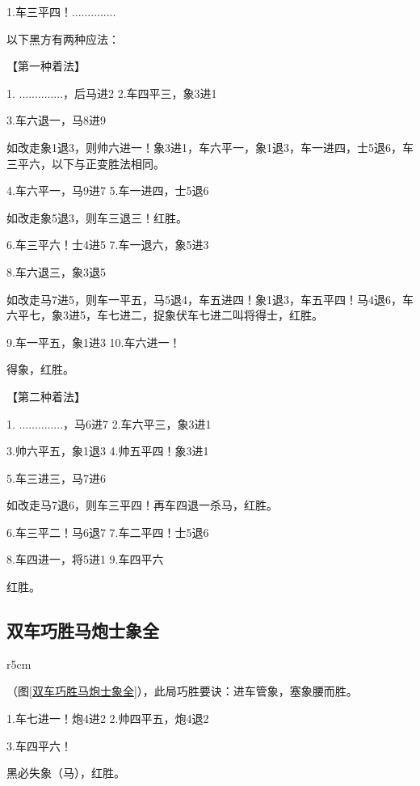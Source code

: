 \documentclass[UTF8]{ctexbook}
\newcommand{\rc}[2]{\piece{#1}{#2}{r}} \newcommand{\bc}[2]{\piece{#1}{#2}{R}}
\newcommand{\rj}[2]{\piece{#1}{#2}{k}} \newcommand{\bj}[2]{\piece{#1}{#2}{K}}
\begin{document}
1.车三平四！..............

以下黑方有两种应法：

【第一种着法】

1. ..............，后马进2 \qquad 2.车四平三，象3进1

3.车六退一，马8进9

如改走象1退3，则帅六进一！象3进1，车六平一，象1退3，车一进四，士5退6，车三平六，以下与正变胜法相同。

4.车六平一，马9进7 \qquad 5.车一进四，士5退6

如改走象5退3，则车三退三！红胜。

6.车三平六！士4进5 \qquad 7.车一退六，象5进3

8.车六退三，象3退5

如改走马7进5，则车一平五，马5退4，车五进四！象1退3，车五平四！马4退6，车六平七，象3进5，车七进二，捉象伏车七进二叫将得士，红胜。

9.车一平五，象1进3 10.车六进一！

得象，红胜。

【第二种着法】

1. ..............，马6进7 \qquad 2.车六平三，象3进1

3.帅六平五，象1退3 \qquad 4.帅五平四！象3进1

5.车三进三，马7进6

如改走马7退6，则车三平四！再车四退一杀马，红胜。

6.车三平二！马6退7 \qquad 7.车二平四！士5退6

8.车四进一，将5进1 \qquad 9.车四平六

红胜。
\subsection{双车巧胜马炮士象全}
\begin{wrapfigure}{r}{5cm}
\centering
\vspace{-1.5cm}
\smallboard
\begin{position}
\rj{f}{1} \rc{f}{7} \rc{c}{7}

\bj{e}{10}    
 
\end{position}
\caption{}\label{双车巧胜马炮士象全} 
\end{wrapfigure}
（图\ref{双车巧胜马炮士象全}），此局巧胜要诀：进车管象，塞象腰而胜。

1.车七进一！炮4进2 \qquad 2.帅四平五，炮4退2

3.车四平六！

黑必失象（马），红胜。
\end{document}
